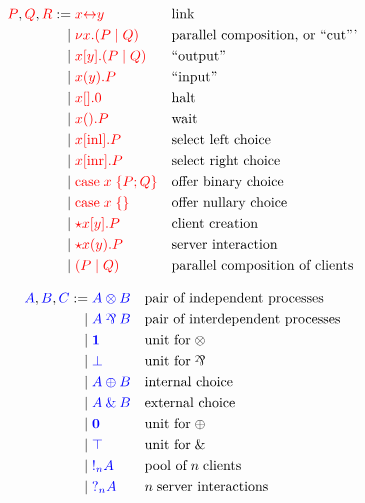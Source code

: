 \documentclass[12pt,UKenglish]{article}
\begin{document}
\[\!
  \begin{aligned}
    \textcolor{red}{P}, \textcolor{red}{Q}, \textcolor{red}{R}
         :=& \; \textcolor{red}{x{\leftrightarrow}y}       &&\text{link}
    \\ \mid& \; \textcolor{red}{\nu x.(P \mid Q)}     &&\text{parallel composition, or ``cut'''}
    \\ \mid& \; \textcolor{red}{x[y].(P \mid Q)} &&\text{``output''}
    \\ \mid& \; \textcolor{red}{x(y).P}    &&\text{``input''}
    \\ \mid& \; \textcolor{red}{x[].0}          &&\text{halt}
    \\ \mid& \; \textcolor{red}{x().P}       &&\text{wait}
    \\ \mid& \; \textcolor{red}{x[\text{inl}].P}        &&\text{select left choice}
    \\ \mid& \; \textcolor{red}{x[\text{inr}].P}        &&\text{select right choice}
    \\ \mid& \; \textcolor{red}{\text{case}\;x\;\{P;Q\}}    &&\text{offer binary choice}
    \\ \mid& \; \textcolor{red}{\text{case}\;x\;\{\}}        &&\text{offer nullary choice}
    \\ \mid& \; \textcolor{red}{{\star}{x}[y].P} &&\text{client creation}
    \\ \mid& \; \textcolor{red}{{\star}{x}(y).P} &&\text{server interaction}
    \\ \mid& \; \textcolor{red}{(P \mid Q)}   &&\text{parallel composition of clients}
  \end{aligned}
\]  

\clearpage

\[\!
  \begin{aligned}
    \ty{A}, \ty{B}, \ty{C}
         :=& \; \ty{A \tens B} &&\text{pair of independent processes}
    \\ \mid& \; \ty{A \parr B} &&\text{pair of interdependent processes}
    \\ \mid& \; \ty{\one}      &&\text{unit for} \; {\tens}
    \\ \mid& \; \ty{\bot}      &&\text{unit for} \; {\parr}
    \\ \mid& \; \ty{A \plus B} &&\text{internal choice}
    \\ \mid& \; \ty{A \with B} &&\text{external choice}
    \\ \mid& \; \ty{\nil}      &&\text{unit for} \; {\plus}
    \\ \mid& \; \ty{\top}      &&\text{unit for} \; {\with}
    \\ \mid& \; \ty{\take[n]{A}} &&\text{pool of} \; n \; \text{clients}
    \\ \mid& \; \ty{\give[n]{A}} &&n \; \text{server interactions}
  \end{aligned}
\]
\end{document}
